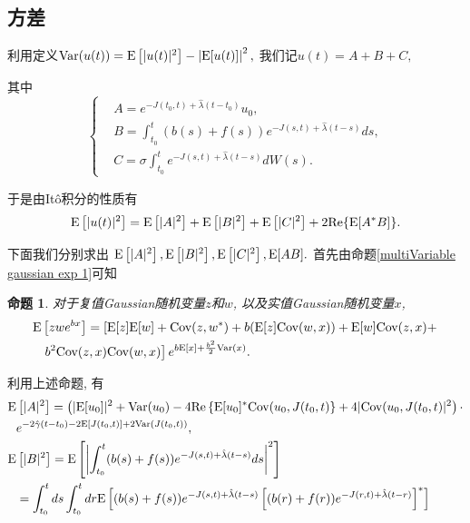\documentclass[notitlepage,cs4size,punct,oneside]{ctexrep}
\numberwithin{equation}{section}
\theoremstyle{mystyle}
\newtheorem{proposition}[definition]{\hspace{2em}命题}
\begin{document}
\subsection{方差}
利用定义$\text{Var}(u(t)) = \text{E}\left[|u(t)|^2\right] - \left|\text{E}[u(t)]\right|^2,$
我们记$u(t) = A + B + C,$

其中
\[\left\{
\begin{split}
&A = e^{-J(t_0, t)+\hat{\lambda}(t-t_0)}u_0, \\
&B = \int_{t_0}^t (b(s)+f(s))e^{-J(s, t)+\hat{\lambda}(t-s)}ds, \\
&C = \sigma\int_{t_0}^t e^{-J(s, t)+\hat{\lambda}(t-s)}dW(s).
\end{split}
\right.
\]

于是由It\^{o}积分的性质有
\begin{equation} \label{E u(t)^2}
\text{E}\left[|u(t)|^2\right] = \text{E}\left[|A|^2\right]+ \text{E}\left[|B|^2\right] + \text{E}\left[|C|^2\right] + 2\text{Re}\{\text{E}[A^*B]\}.
\end{equation}

下面我们分别求出
$
\text{E}\left[|A|^2\right], \text{E}\left[|B|^2\right], \text{E}\left[|C|^2\right], \text{E}[AB].
$
首先由命题\ref{multiVariable gaussian exp 1}可知
\begin{proposition}  \label{multiVariable gaussian exp 3} 对于复值Gaussian随机变量$z$和$w$, 以及实值Gaussian随机变量$x$,
\[
\begin{split}
\text{E}&\left[zwe^{bx}\right] = \left[\text{E}[z]\text{E}[w]+\text{Cov}(z, w^*)+b(\text{E}[z]\text{Cov}(w, x))+\text{E}[w]\text{Cov}(z, x)+ \right. \\
& \left.b^2\text{Cov}(z, x)\text{Cov}(w, x)\right]e^{b\text{E}[x]+\frac{b^2}{2}\text{Var}(x)}. \\
\end{split}
\]
\end{proposition}

利用上述命题, 有
\[
\begin{split}
\text{E}&\left[|A|^2\right] = \left(|\text{E}[u_0]|^2 +\text{Var}(u_0) - 4\text{Re}\left\{\text{E}[u_0]^*\text{Cov}(u_0, J(t_0, t)\right\} +4|\text{Cov}(u_0, J(t_0, t)|^2\right) \cdot \\
& e^{-2\hat{\gamma}(t-t_0)-2\text{E}[J(t_0, t)]+2\text{Var}(J(t_0, t))}, \\
\text{E}&\left[|B|^2\right] = \text{E}\left[\left|\int_{t_0}^t (b(s)+f(s))e^{-J(s, t)+\hat{\lambda}(t-s)}ds\right|^2\right] \\
&= \int_{t_0}^t ds\int_{t_0}^t dr \text{E}\left[(b(s)+f(s))e^{-J(s, t)+\hat{\lambda}(t-s)}\left[(b(r)+f(r))e^{-J(r, t)+\hat{\lambda}(t-r)}\right]^*\right]
\end{split}
\]
\end{document}
